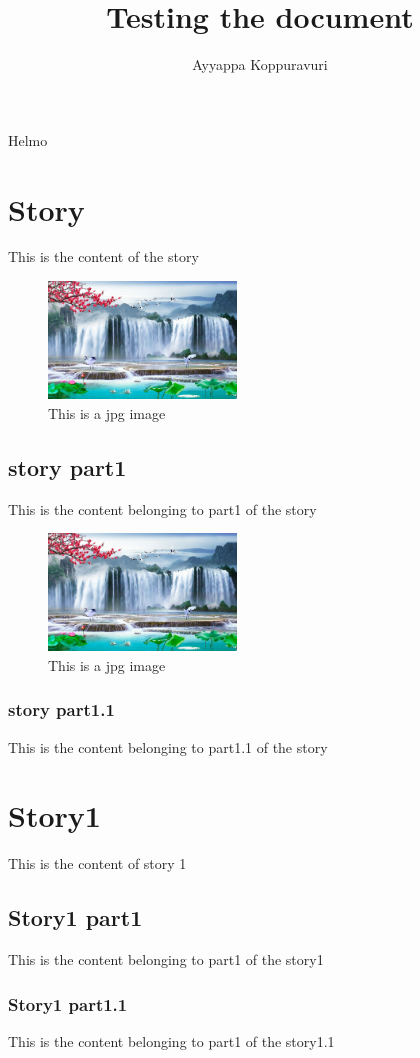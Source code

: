 \documentclass{article}
\title{Testing the document}
\author{Ayyappa Koppuravuri}
\begin{document}
\maketitle
\tableofcontents

Helmo
\section{Story}
This is the content of the story

\begin{figure}[h]
	\centering
	\includegraphics[width=5cm]{image1.jpg}
	\caption{This is a jpg image}
\end{figure}



\subsection{story part1}
This is the content belonging to part1 of the story

\begin{figure}[h]
	\centering
	\includegraphics[width=5cm]{image1.jpg}
	\caption{This is a jpg image}
\end{figure}



\subsubsection{story part1.1}
This is the content belonging to part1.1 of the story

\section{Story1}
This is the content of story 1

\subsection{Story1 part1}
This is the content belonging to part1 of the story1

\subsubsection{Story1 part1.1}
This is the content belonging to part1 of the story1.1
\end{document}
